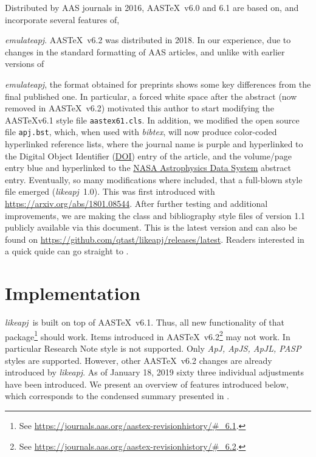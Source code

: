 \documentclass[tighten,twocolumn,useAMS,appendixfloats,apj]{likeapj}
\newcommand{\likeapj}{\textit{likeapj}}
\newcommand\aastex{AAS\TeX}
\begin{document}
Distributed by AAS journals in 2016, \aastex\ v6.0 and 6.1 are based on, and incorporate several features of, {\textit{emulateapj}. \aastex\ v6.2 was distributed in 2018. In our experience, due to changes in the standard formatting of AAS articles, and unlike with earlier versions of {\textit{emulateapj}, the format obtained for preprints shows some key differences from the final published one. In particular, a forced white space after the abstract (now removed in \aastex\ v6.2) motivated this author to start modifying the \aastex v6.1 style file {\tt aastex61.cls}. In addition, we modified the open source file {\tt apj.bst}, which, when used with {\it bibtex}, will now produce color-coded hyperlinked reference lists, where the journal name is purple and hyperlinked to the Digital Object Identifier (\href{http://www.doi.org/index.html}{DOI}) entry of the article, and the volume/page entry blue and hyperlinked to the \href{https://ui.adsabs.harvard.edu/}{NASA Astrophysics Data System} abstract entry. Eventually, so many modifications where included, that a full-blown style file emerged (\likeapj\ 1.0). This was first introduced with \href{https://arxiv.org/abs/1801.08544}{https://arxiv.org/abs/1801.08544}. After further testing and additional improvements, we are making the class and bibliography style files of version 1.1 publicly available via this document. This is the latest version and can also be found on \href{https://github.com/qtast/likeapj/releases/latest}{https://github.com/qtast/likeapj/releases/latest}. Readers interested in a quick quide can go straight to .

    \section{Implementation}
    \likeapj\ is built on top of \aastex\ v6.1. Thus, all new functionality of that package\footnote{See \href{https://journals.aas.org/aastex-revisionhistory/\#\_6.1}{https://journals.aas.org/aastex-revisionhistory/\#\_6.1}.} should work. Items introduced in \aastex\ v6.2\footnote{See \href{https://journals.aas.org/aastex-revisionhistory/\#\_6.2}{https://journals.aas.org/aastex-revisionhistory/\#\_6.2}.} may not work. In particular Research Note style is not supported. Only {\it ApJ, ApJS, ApJL, PASP} styles are supported. However, other \aastex\ v6.2 changes are already introduced by \textit{likeapj}. As of January 18, 2019 sixty three individual adjustments have been introduced. We present an overview of features introduced below, which corresponds to the condensed summary presented in . 

}}
\end{document}
